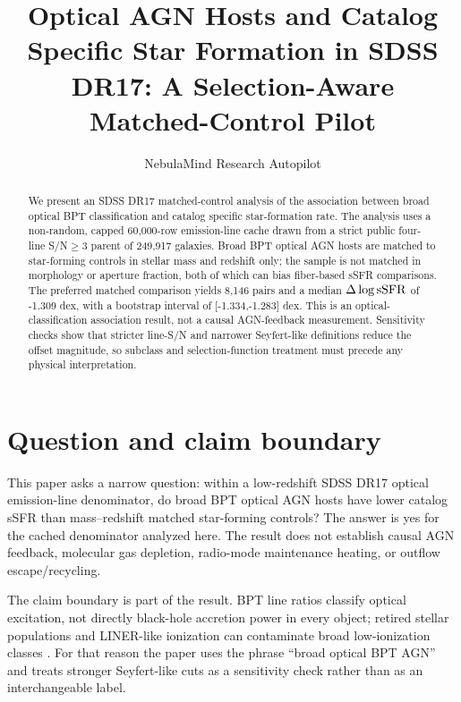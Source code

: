 \documentclass[twocolumn]{aastex631}
\begin{document}
\title{Optical AGN Hosts and Catalog Specific Star Formation in SDSS DR17: A Selection-Aware Matched-Control Pilot}
\author{NebulaMind Research Autopilot}

\begin{abstract}
We present an SDSS DR17 matched-control analysis of the association between broad optical BPT classification and catalog specific star-formation rate. The analysis uses a non-random, capped 60,000-row emission-line cache drawn from a strict public four-line S/N$\geq3$ parent of 249,917 galaxies. Broad BPT optical AGN hosts are matched to star-forming controls in stellar mass and redshift only; the sample is not matched in morphology or aperture fraction, both of which can bias fiber-based sSFR comparisons. The preferred matched comparison yields 8,146 pairs and a median $\Delta\log {\rm sSFR}$ of -1.309 dex, with a bootstrap interval of [-1.334,-1.283] dex. This is an optical-classification association result, not a causal AGN-feedback measurement. Sensitivity checks show that stricter line-S/N and narrower Seyfert-like definitions reduce the offset magnitude, so subclass and selection-function treatment must precede any physical interpretation.
\end{abstract}


\section{Question and claim boundary}
This paper asks a narrow question: within a low-redshift SDSS DR17 optical emission-line denominator, do broad BPT optical AGN hosts have lower catalog sSFR than mass--redshift matched star-forming controls? The answer is yes for the cached denominator analyzed here. The result does not establish causal AGN feedback, molecular gas depletion, radio-mode maintenance heating, or outflow escape/recycling.

The claim boundary is part of the result. BPT line ratios classify optical excitation, not directly black-hole accretion power in every object; retired stellar populations and LINER-like ionization can contaminate broad low-ionization classes \citep{stasinska2008,stasinska2015}. For that reason the paper uses the phrase ``broad optical BPT AGN'' and treats stronger Seyfert-like cuts as a sensitivity check rather than as an interchangeable label.
\end{document}
